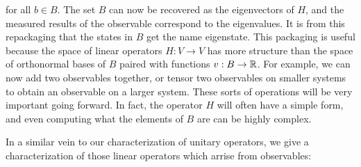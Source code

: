 for all $b\in B$. The set $B$ can now be recovered as the eigenvectors of $H$, and the measured results of the observable correspond to the eigenvalues. It is from this repackaging that the states in $B$ get the name eigenstate. This packaging is useful because the space of linear operators $H:V\to V$ has more structure than the space of orthonormal bases of $B$ paired with functions $v:B\to \mathbb{R}$. For example, we can now add two observables together, or tensor two observables on smaller systems to obtain an observable on a larger system. These sorts of operations will be very important going forward. In fact, the operator $H$ will often have a simple form, and even computing what the elements of $B$ are can be highly complex.

In a similar vein to our characterization of unitary operators, we give a characterization of those linear operators which arrise from observables:

